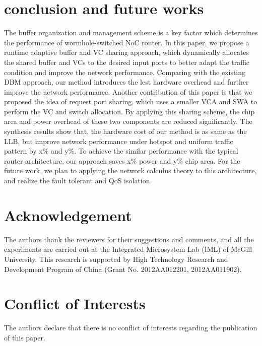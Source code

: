 \documentclass[10pt,conference]{IEEEtran}
\begin{document}
\section{conclusion and future works}\label{conc}
The buffer organization and management scheme is a key factor which determines the performance of wormhole-switched NoC router. In this paper, we propose a runtime adaptive buffer and VC sharing approach, which dynamically allocates the shared buffer and VCs to the desired input ports to better adapt the traffic condition and improve the network performance. Comparing with the existing DBM approach, our method introduces the lest hardware overhead and further improve the network performance. Another contribution of this paper is that we proposed the idea of request port sharing, which uses a smaller VCA and SWA to perform the VC and switch allocation. By applying this sharing scheme, the chip area and power overhead of these two components are reduced significantly. The synthesis results show that, the hardware cost of our method is as same as the LLB, but improve network performance under hotspot and uniform traffic pattern by x\% and y\%. To achieve the similar performance with the typical router architecture, our approach saves x\% power and y\% chip area. For the future work, we plan to applying the network calculus theory to this architecture, and realize the fault tolerant and QoS isolation.

\section*{Acknowledgement}
The authors thank the reviewers for their suggestions and comments, and all the experiments are carried out at the Integrated Microsystem Lab (IML) of McGill University. This research is supported by High Technology Research and Development Program of China (Grant No. 2012AA012201, 2012AA011902).

\section*{Conflict of Interests}
The authors declare that there is no conflict of interests regarding the publication of this paper.



\end{document}
